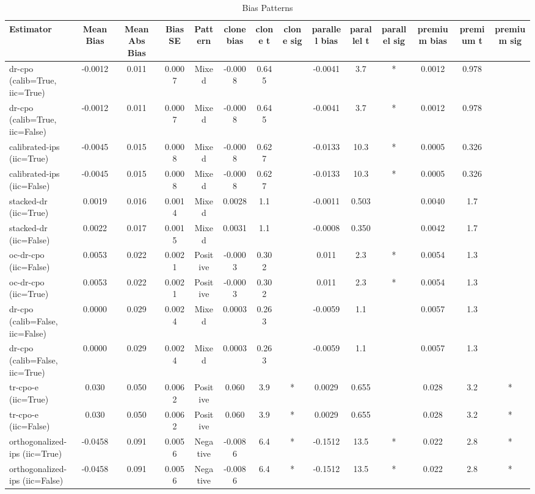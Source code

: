 \begin{table}[htbp]
\centering
\caption{Bias Patterns}
\label{tab:A2}
\begin{tabular}{l|ccccccccccccc}
\toprule
Estimator & Mean Bias & Mean Abs Bias & Bias SE & Pattern & clone bias & clone t & clone sig & parallel bias & parallel t & parallel sig & premium bias & premium t & premium sig \\
\midrule
dr-cpo (calib=True, iic=True) & -0.0012 & 0.011 & 0.0007 & Mixed & -0.0008 & 0.645 &  & -0.0041 & 3.7 & * & 0.0012 & 0.978 &  \\
dr-cpo (calib=True, iic=False) & -0.0012 & 0.011 & 0.0007 & Mixed & -0.0008 & 0.645 &  & -0.0041 & 3.7 & * & 0.0012 & 0.978 &  \\
calibrated-ips (iic=True) & -0.0045 & 0.015 & 0.0008 & Mixed & -0.0008 & 0.627 &  & -0.0133 & 10.3 & * & 0.0005 & 0.326 &  \\
calibrated-ips (iic=False) & -0.0045 & 0.015 & 0.0008 & Mixed & -0.0008 & 0.627 &  & -0.0133 & 10.3 & * & 0.0005 & 0.326 &  \\
stacked-dr (iic=True) & 0.0019 & 0.016 & 0.0014 & Mixed & 0.0028 & 1.1 &  & -0.0011 & 0.503 &  & 0.0040 & 1.7 &  \\
stacked-dr (iic=False) & 0.0022 & 0.017 & 0.0015 & Mixed & 0.0031 & 1.1 &  & -0.0008 & 0.350 &  & 0.0042 & 1.7 &  \\
oc-dr-cpo (iic=False) & 0.0053 & 0.022 & 0.0021 & Positive & -0.0003 & 0.302 &  & 0.011 & 2.3 & * & 0.0054 & 1.3 &  \\
oc-dr-cpo (iic=True) & 0.0053 & 0.022 & 0.0021 & Positive & -0.0003 & 0.302 &  & 0.011 & 2.3 & * & 0.0054 & 1.3 &  \\
dr-cpo (calib=False, iic=False) & 0.0000 & 0.029 & 0.0024 & Mixed & 0.0003 & 0.263 &  & -0.0059 & 1.1 &  & 0.0057 & 1.3 &  \\
dr-cpo (calib=False, iic=True) & 0.0000 & 0.029 & 0.0024 & Mixed & 0.0003 & 0.263 &  & -0.0059 & 1.1 &  & 0.0057 & 1.3 &  \\
tr-cpo-e (iic=True) & 0.030 & 0.050 & 0.0062 & Positive & 0.060 & 3.9 & * & 0.0029 & 0.655 &  & 0.028 & 3.2 & * \\
tr-cpo-e (iic=False) & 0.030 & 0.050 & 0.0062 & Positive & 0.060 & 3.9 & * & 0.0029 & 0.655 &  & 0.028 & 3.2 & * \\
orthogonalized-ips (iic=True) & -0.0458 & 0.091 & 0.0056 & Negative & -0.0086 & 6.4 & * & -0.1512 & 13.5 & * & 0.022 & 2.8 & * \\
orthogonalized-ips (iic=False) & -0.0458 & 0.091 & 0.0056 & Negative & -0.0086 & 6.4 & * & -0.1512 & 13.5 & * & 0.022 & 2.8 & * \\

\end{tabular}
\end{table}
